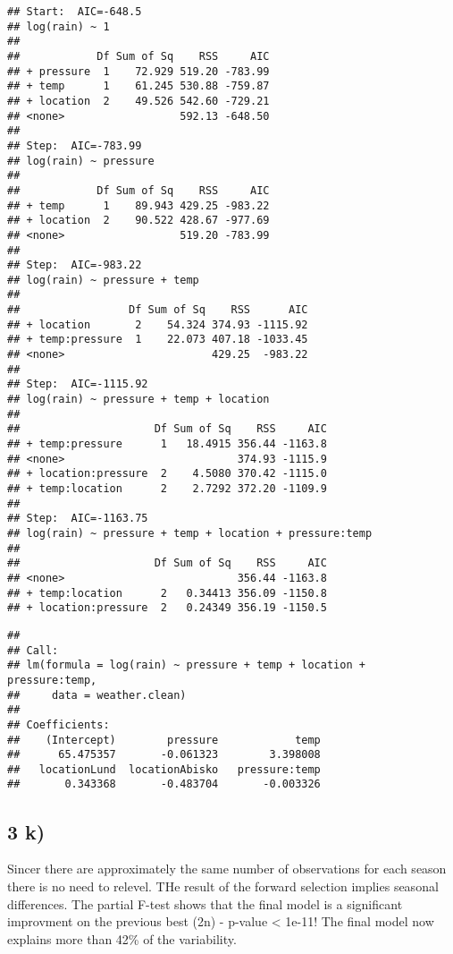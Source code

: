 \documentclass[]{article}
\begin{document}
\begin{verbatim}
## Start:  AIC=-648.5
## log(rain) ~ 1
## 
##            Df Sum of Sq    RSS     AIC
## + pressure  1    72.929 519.20 -783.99
## + temp      1    61.245 530.88 -759.87
## + location  2    49.526 542.60 -729.21
## <none>                  592.13 -648.50
## 
## Step:  AIC=-783.99
## log(rain) ~ pressure
## 
##            Df Sum of Sq    RSS     AIC
## + temp      1    89.943 429.25 -983.22
## + location  2    90.522 428.67 -977.69
## <none>                  519.20 -783.99
## 
## Step:  AIC=-983.22
## log(rain) ~ pressure + temp
## 
##                 Df Sum of Sq    RSS      AIC
## + location       2    54.324 374.93 -1115.92
## + temp:pressure  1    22.073 407.18 -1033.45
## <none>                       429.25  -983.22
## 
## Step:  AIC=-1115.92
## log(rain) ~ pressure + temp + location
## 
##                     Df Sum of Sq    RSS     AIC
## + temp:pressure      1   18.4915 356.44 -1163.8
## <none>                           374.93 -1115.9
## + location:pressure  2    4.5080 370.42 -1115.0
## + temp:location      2    2.7292 372.20 -1109.9
## 
## Step:  AIC=-1163.75
## log(rain) ~ pressure + temp + location + pressure:temp
## 
##                     Df Sum of Sq    RSS     AIC
## <none>                           356.44 -1163.8
## + temp:location      2   0.34413 356.09 -1150.8
## + location:pressure  2   0.24349 356.19 -1150.5
\end{verbatim}

\begin{verbatim}
## 
## Call:
## lm(formula = log(rain) ~ pressure + temp + location + pressure:temp, 
##     data = weather.clean)
## 
## Coefficients:
##    (Intercept)        pressure            temp  
##      65.475357       -0.061323        3.398008  
##   locationLund  locationAbisko   pressure:temp  
##       0.343368       -0.483704       -0.003326
\end{verbatim}

\hypertarget{k}{%
\subsection{3 k)}\label{k}}

Sincer there are approximately the same number of observations for each
season there is no need to relevel. THe result of the forward selection
implies seasonal differences. The partial F-test shows that the final
model is a significant improvment on the previous best (2n) - p-value
\textless{} 1e-11! The final model now explains more than 42\% of the
variability.
\end{document}
